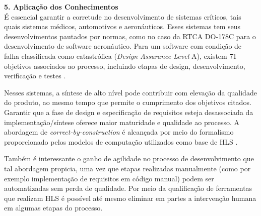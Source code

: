 \noindent
\textbf{5. Aplicação dos Conhecimentos}\\
\noindent
É essencial garantir a corretude no desenvolvimento de sistemas críticos, tais quais sistemas médicos, automotivos e aeronáuticos. Esses sistemas tem seus desenvolvimentos pautados por normas, como no caso da RTCA DO-178C para o desenvolvimento de software aeronáutico. Para um software com condição de falha classificada como catastrófica (\emph{Design Assurance Level} A), existem 71 objetivos associados ao processo, incluindo etapas de design, desenvolvimento, verificação e testes \cite{DO-178}.

\noindent
Nesses sistemas, a síntese de alto nível pode contribuir com elevação da qualidade do produto, ao mesmo tempo que permite o cumprimento dos objetivos citados. Garantir que a fase de design e especificação de requisitos esteja desassociada da implementação/síntese oferece maior maturidade e qualidade ao processo. A abordagem de \emph{correct-by-construction} é alcançada por meio do formalismo proporcionado pelos modelos de computação utilizados como base de HLS \cite{Edwards}.

\noindent
Também é interessante o ganho de agilidade no processo de desenvolvimento que tal abordagem propicia, uma vez que etapas realizadas manualmente (como por exemplo implementação de requisitos em código manual) podem ser automatizadas sem perda de qualidade. Por meio da qualificação de ferramentas que realizam HLS é possível até mesmo eliminar em partes a intervenção humana em algumas etapas do processo.